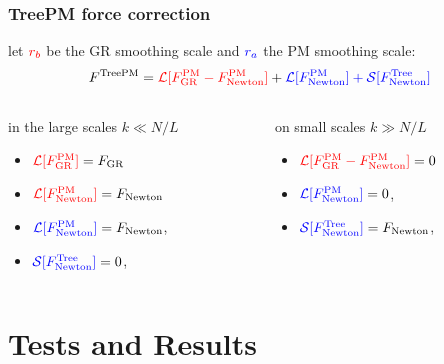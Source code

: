 \documentclass{beamer}
\makeatletter
\newcommand{\mylabel}{%
}
\makeatother
\begin{document}
\begin{frame}[label=forceaddition2]
    \frametitle{TreePM force correction\mylabel}
let $\color{red} r_b$ be the GR smoothing scale and $\color{blue}r_a$ the PM smoothing scale:
\[
    F^{\text{TreePM}}
    =
    {\color{red} 
       \mathcal{L}[F_{\text{GR}}^{\text{PM}}-F_{\text{Newton}}^{\text{PM}}]
    }
    +{\color{blue}\mathcal{L}[F_{\text{Newton}}^{\text{PM}}]
    +\mathcal{S}[F_{\text{Newton}}^{\text{Tree}}]}
\]
    
    \begin{columns}
    \begin{column}{0.5\textwidth}
        in the large scales $k\ll N/L$
        \begin{itemize}
            \item 
                ${\color{red} \mathcal{L} [ F_{\text{GR}}^{\text{PM}} ] }=F_{\text{GR}}$
            \item
                ${\color{red} \mathcal{L} [ F_{\text{Newton}}^{\text{PM}} ] }=F_{\text{Newton}}$
            \item
            ${\color{blue}\mathcal{L}[F_{\text{Newton}}^{\text{PM}}]}=F_{\text{Newton}}$,
            \item
            ${\color{blue}\mathcal{S}[F_{\text{Newton}}^{\text{Tree}}]}=0$, 
        \end{itemize}
    \end{column}
    \begin{column}{0.5\textwidth}
        on small scales $k\gg N/L$
        \begin{itemize}
            \item 
                ${\color{red} \mathcal{L}[ 
                    F_{\text{GR}}^{\text{PM}} 
                    -F_{\text{Newton}}^{\text{PM}} 
                    ] } = 0$
            \item 
            ${\color{blue}\mathcal{L}[F_{\text{Newton}}^{\text{PM}}]}=0$,
            \item
            ${\color{blue}\mathcal{S}[F_{\text{Newton}}^{\text{Tree}}]}
                =F_{\text{Newton}}$, 
        \end{itemize}
    \end{column}
    \end{columns}
\end{frame}

\section{Tests and Results}
\frame{\sectionpage}
\end{document}
